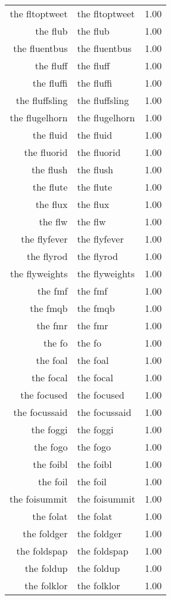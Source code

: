 \begin{table}[ht]
\begin{tabular}{rlr}
  the fltoptweet & the fltoptweet & 1.00 \\ 
  the flub & the flub & 1.00 \\ 
  the fluentbus & the fluentbus & 1.00 \\ 
  the fluff & the fluff & 1.00 \\ 
  the fluffi & the fluffi & 1.00 \\ 
  the fluffsling & the fluffsling & 1.00 \\ 
  the flugelhorn & the flugelhorn & 1.00 \\ 
  the fluid & the fluid & 1.00 \\ 
  the fluorid & the fluorid & 1.00 \\ 
  the flush & the flush & 1.00 \\ 
  the flute & the flute & 1.00 \\ 
  the flux & the flux & 1.00 \\ 
  the flw & the flw & 1.00 \\ 
  the flyfever & the flyfever & 1.00 \\ 
  the flyrod & the flyrod & 1.00 \\ 
  the flyweights & the flyweights & 1.00 \\ 
  the fmf & the fmf & 1.00 \\ 
  the fmqb & the fmqb & 1.00 \\ 
  the fmr & the fmr & 1.00 \\ 
  the fo & the fo & 1.00 \\ 
  the foal & the foal & 1.00 \\ 
  the focal & the focal & 1.00 \\ 
  the focused & the focused & 1.00 \\ 
  the focussaid & the focussaid & 1.00 \\ 
  the foggi & the foggi & 1.00 \\ 
  the fogo & the fogo & 1.00 \\ 
  the foibl & the foibl & 1.00 \\ 
  the foil & the foil & 1.00 \\ 
  the foisummit & the foisummit & 1.00 \\ 
  the folat & the folat & 1.00 \\ 
  the foldger & the foldger & 1.00 \\ 
  the foldspap & the foldspap & 1.00 \\ 
  the foldup & the foldup & 1.00 \\ 
  the folklor & the folklor & 1.00 \\ 

\end{tabular}
\end{table}
